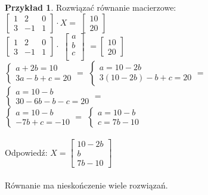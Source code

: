 \documentclass{article}
\theoremstyle{definition}
\theoremstyle{definition}
\theoremstyle{definition}
\newtheorem{pk}{Przykład}[subsection]
\theoremstyle{definition}
\begin{document}
\begin{pk}
Rozwiązać równanie macierzowe:\\

$ \begin{bmatrix}
    1 & 2 & 0 \\
    3 & -1 & 1 
    \end{bmatrix}  \cdot X =$
$ \begin{bmatrix}
    10 \\
    20 
    \end{bmatrix}  $\\

$ \begin{bmatrix}
    1 & 2 & 0 \\
    3 & -1 & 1 
    \end{bmatrix}  \cdot$
$ \begin{bmatrix}
    a \\
    b \\
    c \\
    \end{bmatrix}  $
$ =\begin{bmatrix}
    10 \\
    20 
    \end{bmatrix}  $\\

$\begin{cases}
    a+2b=10\\
    3a-b+c=20
\end{cases}=$
$\begin{cases}
    a=10-2b\\
    3(10-2b)-b+c=20
\end{cases}=$
$\begin{cases}
    a=10-b\\
    30-6b-b-c=20
\end{cases}=$\\
$\begin{cases}
    a=10-b\\
    -7b+c=-10
\end{cases}=$
$\begin{cases}
    a=10-b\\
    c=7b-10
\end{cases}$\\\\

Odpowiedź:
$X=\begin{bmatrix}
    10-2b \\
    b \\
    7b-10 
\end{bmatrix}  $\\\\
Równanie ma nieskończenie wiele rozwiązań.
\end{pk}
\end{document}
